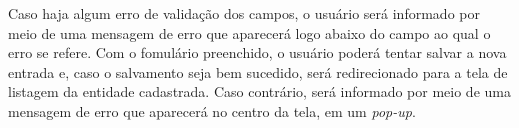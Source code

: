 Caso haja algum erro de validação dos campos, o usuário será informado por meio de uma mensagem de erro que aparecerá logo abaixo do campo ao qual o erro se refere. Com o fomulário preenchido, o usuário poderá tentar salvar a nova entrada e, caso o salvamento seja bem sucedido, será redirecionado para a tela de listagem da entidade cadastrada. Caso contrário, será informado por meio de uma mensagem de erro que aparecerá no centro da tela, em um \textit{pop-up}.

\begin{figure}[ht!]
  \centering
        \qquad
        \qquad

\end{figure}
